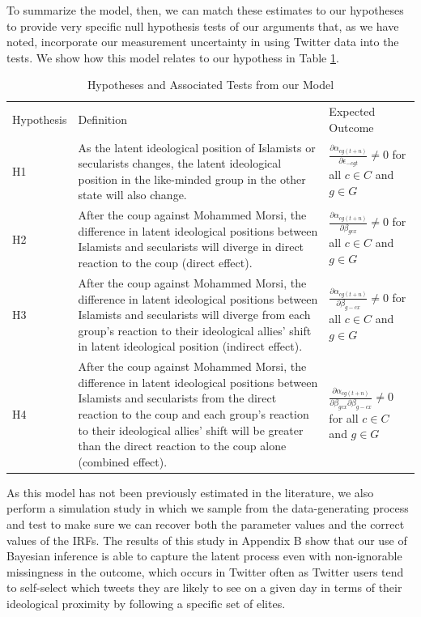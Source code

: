 \documentclass[12pt]{article}
\begin{document}
To summarize the model, then, we can match these estimates to our hypotheses to provide very specific null hypothesis tests of our arguments that, as we have noted, incorporate our measurement uncertainty in using Twitter data into the tests. We show how this model relates to our hypothess in Table \ref{Htests}.
\begin{table}[h!]
	\centering
	\caption{Hypotheses and Associated Tests from our Model}\label{Htests}
	\scriptsize
	\begin{tabular}{lp{7cm}l}
		Hypothesis & Definition & Expected Outcome\\
		H1 & As the latent ideological position of Islamists or secularists changes, the latent ideological position in the like-minded group in the other state will also change. & $\frac{\partial \alpha_{cg(t+n)}}{\partial \epsilon_{-cgt}}\neq0$ for all $c \in C$ and $g \in G$\\[1em]
		H2 & After the coup against Mohammed Morsi, the difference in latent ideological positions between Islamists and secularists will diverge in direct reaction to the coup (direct effect). & $\frac{\partial \alpha_{cg(t+n)}}{\partial \beta_{gcx}}\neq0$ for all $c \in C$ and $g \in G$\\[1em]
		H3 & After the coup against Mohammed Morsi, the difference in latent ideological positions between Islamists and secularists will diverge from each group's reaction to their ideological allies' shift in latent ideological position (indirect effect). & $\frac{\partial \alpha_{cg(t+n)}}{\partial \beta_{g-cx}}\neq0$ for all $c \in C$ and $g \in G$\\[1em]
		H4 & After the coup against Mohammed Morsi, the difference in latent ideological positions between Islamists and secularists from the direct reaction to the coup and each group's reaction to their ideological allies' shift will be greater than the direct reaction to the coup alone (combined effect). & $\frac{\partial \alpha_{cg(t+n)}}{\partial \beta_{gcx}\partial \beta_{g-cx}}\neq0$ for all $c \in C$ and $g \in G$
	\end{tabular}
\end{table}

As this model has not been previously estimated in the literature, we also perform a simulation study in which we sample from the data-generating process and test to make sure we can recover both the parameter values and the correct values of the IRFs. The results of this study in Appendix B show that our use of Bayesian inference is able to capture the latent process even with non-ignorable missingness in the outcome, which occurs in Twitter often as Twitter users tend to self-select which tweets they are likely to see on a given day in terms of their ideological proximity by following a specific set of elites.
\end{document}
